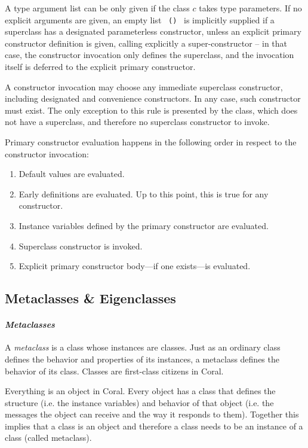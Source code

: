 A type argument list can be only given if the class $c$ takes type parameters. If no explicit arguments are given, an empty list ~\lstinline!()!~ is implicitly supplied if a superclass has a designated parameterless constructor, unless an explicit primary constructor definition is given, calling explicitly a super-constructor -- in that case, the constructor invocation only defines the superclass, and the invocation itself is deferred to the explicit primary constructor. 

A constructor invocation may choose any immediate superclass constructor, including designated and convenience constructors. In any case, such constructor must exist. The only exception to this rule is presented by the  class, which does not have a superclass, and therefore no superclass constructor to invoke. 

Primary constructor evaluation happens in the following order in respect to the constructor invocation: 
\begin{enumerate}
  \item Default values are evaluated. 
  \item Early definitions are evaluated. Up to this point, this is true for any constructor. 
  \item Instance variables defined by the primary constructor are evaluated. 
  \item Superclass constructor is invoked. 
  \item Explicit primary constructor body---if one exists---is evaluated. 
\end{enumerate}





\subsection{Metaclasses \& Eigenclasses}
\label{sec:metaclasses}
\label{sec:eigenclasses}

\paragraph{\em Metaclasses}
A {\em metaclass} is a class whose instances are classes. Just as an ordinary class defines the behavior and properties of its instances, a metaclass defines the behavior of its class. Classes are first-class citizens in Coral. 

Everything is an object in Coral. Every object has a class that defines the structure (i.e. the instance variables) and behavior of that object (i.e. the messages the object can receive and the way it responds to them). Together this implies that a class is an object and therefore a class needs to be an instance of a class (called metaclass). 

